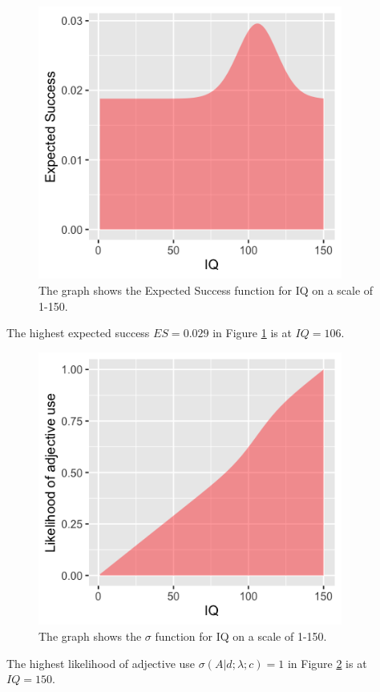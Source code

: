 \documentclass[11pt,a4paper,oneside]{article}
\begin{document}
\begin{figure}[H]
    \centering
    \includegraphics[width=100mm]{figs/Question_2_IQ_es.png}
    \caption{The graph shows the Expected Success function for IQ on a scale of 1-150.}
  \label{fig:q2_iq_es}
\end{figure}

The highest expected success $ES = 0.029$ in Figure \ref{fig:q2_iq_es} is at $IQ = 106$.


\begin{figure}[H]
    \centering
    \includegraphics[width=100mm]{figs/Question_2_IQ_sigma.png}
    \caption{The graph shows the $\sigma$ function for IQ on a scale of 1-150.}
  \label{fig:q2_iq_sigma}
\end{figure}

The highest likelihood of adjective use $\sigma(A|d; \lambda; c) = 1$ in Figure \ref{fig:q2_iq_sigma} is at $IQ = 150$.
\end{document}
